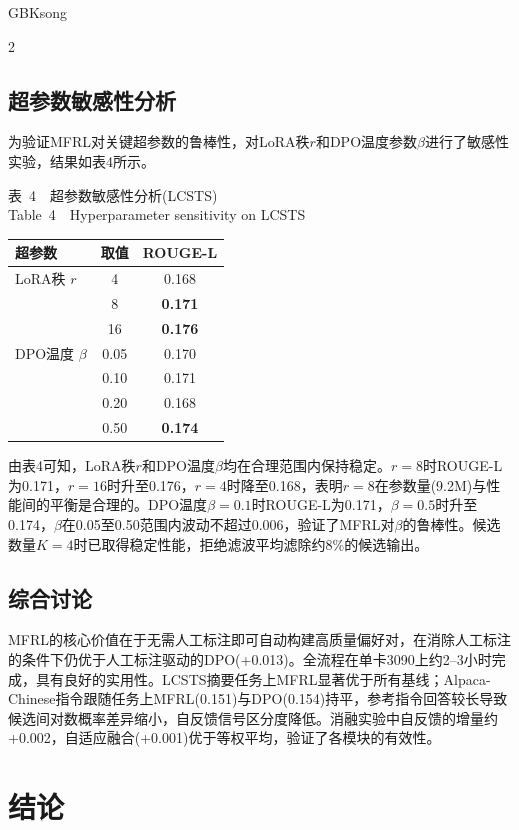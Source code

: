 \begin{CJK*}{GBK}{song}
\begin{multicols}{2}
\subsection{超参数敏感性分析}

为验证MFRL对关键超参数的鲁棒性，对LoRA秩$r$和DPO温度参数$\beta$进行了敏感性实验，结果如表4所示。

\begin{center}
{ 表~4~~超参数敏感性分析(LCSTS)\\
Table~4~~Hyperparameter sensitivity on LCSTS}\\
\label{tab:4} \vskip 3pt
{\fontsize{9.3pt}{11.6pt}\selectfont
\begin{tabular}{@{ }lcc@{ }}\toprule
超参数 & 取值 & ROUGE-L \\\midrule
LoRA秩 $r$ & 4  & 0.168 \\
          & 8  & {\bf 0.171} \\
          & 16 & {\bf 0.176} \\
\midrule
DPO温度 $\beta$ & 0.05 & 0.170 \\
               & 0.10 & 0.171 \\
               & 0.20 & 0.168 \\
               & 0.50 & {\bf 0.174} \\
\bottomrule
\end{tabular}}\end{center}

由表4可知，LoRA秩$r$和DPO温度$\beta$均在合理范围内保持稳定。$r=8$时ROUGE-L为0.171，$r=16$时升至0.176，$r=4$时降至0.168，表明$r=8$在参数量(9.2M)与性能间的平衡是合理的。DPO温度$\beta=0.1$时ROUGE-L为0.171，$\beta=0.5$时升至0.174，$\beta$在0.05至0.50范围内波动不超过0.006，验证了MFRL对$\beta$的鲁棒性。候选数量$K=4$时已取得稳定性能，拒绝滤波平均滤除约8\%的候选输出。

\subsection{综合讨论}

MFRL的核心价值在于无需人工标注即可自动构建高质量偏好对，在消除人工标注的条件下仍优于人工标注驱动的DPO(+0.013)。全流程在单卡3090上约2--3小时完成，具有良好的实用性。LCSTS摘要任务上MFRL显著优于所有基线；Alpaca-Chinese指令跟随任务上MFRL(0.151)与DPO(0.154)持平，参考指令回答较长导致候选间对数概率差异缩小，自反馈信号区分度降低。消融实验中自反馈的增量约+0.002，自适应融合(+0.001)优于等权平均，验证了各模块的有效性。

\section{结论}


\end{multicols}
\end{CJK*}
